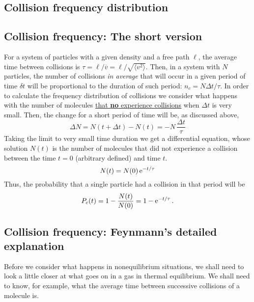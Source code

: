 \begin{subappendices}
\section{Collision frequency distribution}
\subsection{Collision frequency: The short version}

For a system of particles with a given density and a free path $\ell$, the average time between collisions is $\tau = \ell/\overline{v}= \ell/ \sqrt{\langle v^{2} \rangle}$. Then, in a system with $N$ particles, the number of collisions \emph{in average} that will occur in a given period of time $\delta t$ will be proportional to the duration of such period: $n_{c} = N \Delta t/\tau$. In order to calculate the frequency distribution of collisions we consider what happens with the number of molecules \underline{that \textbf{no} experience collisions} when $\Delta t$ is very small. Then, the change for a short period of time will be, as discussed above,
\begin{equation}
  \label{Q:rates-freq-collision-diff}
  \Delta N = N(t+\Delta t) - N(t) = - N \, \frac{\Delta t}{\tau}
\end{equation}
Taking the limit to very small time duration we get a differential equation, whose solution $N(t)$ is the number of molecules that did not experience a collision between the time $t=0$ (arbitrary defined) and time $t$. 
\begin{equation}
  \label{Q:rates-freq-collision-no-col}
  N(t) = N(0)\, \mathrm{e}^{-t/\tau}
\end{equation}
Thus, the probability that a single particle had a collision in that period will be 
\begin{equation}
  \label{Q:rates-freq-collision-prob-dist}
  P_{c}(t) = 1- \frac{N(t)}{N(0)} = 1 - \mathrm{e}^{-t/\tau} \,.
\end{equation}


\subsection{Collision frequency: Feynmann's detailed explanation}

Before we consider what happens in nonequilibrium situations, we shall need to look a little closer at what goes on in a gas in thermal equilibrium. We shall need to know, for example, what the average time between successive collisions of a molecule is.


\end{subappendices}
